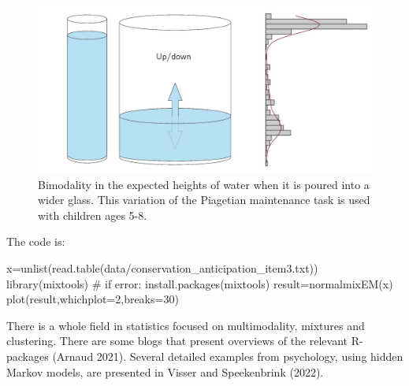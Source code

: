 \documentclass[
  a4paper,
  DIV=11,
  numbers=noendperiod]{scrreprt}
\newenvironment{Shaded}{\begin{snugshade}}{\end{snugshade}}
\newcommand{\AttributeTok}[1]{\textcolor[rgb]{0.40,0.45,0.13}{#1}}
\newcommand{\CommentTok}[1]{\textcolor[rgb]{0.37,0.37,0.37}{#1}}
\newcommand{\DecValTok}[1]{\textcolor[rgb]{0.68,0.00,0.00}{#1}}
\newcommand{\FunctionTok}[1]{\textcolor[rgb]{0.28,0.35,0.67}{#1}}
\newcommand{\NormalTok}[1]{\textcolor[rgb]{0.00,0.23,0.31}{#1}}
\newcommand{\OtherTok}[1]{\textcolor[rgb]{0.00,0.23,0.31}{#1}}
\newcommand{\StringTok}[1]{\textcolor[rgb]{0.13,0.47,0.30}{#1}}
\begin{document}
\begin{figure}

{\centering \includegraphics{media/ch3/fig-ch3-img20-old-32.jpg}

}

\caption{\label{fig-ch3-img20-old-32}Bimodality in the expected heights
of water when it is poured into a wider glass. This variation of the
Piagetian maintenance task is used with children ages 5-8.}

\end{figure}

The code is:

\begin{Shaded}
\begin{Highlighting}[]
\NormalTok{x}\OtherTok{=}\FunctionTok{unlist}\NormalTok{(}\FunctionTok{read.table}\NormalTok{(}\StringTok{\textquotesingle{}data/conservation\_anticipation\_item3.txt\textquotesingle{}}\NormalTok{))}
\FunctionTok{library}\NormalTok{(mixtools) }\CommentTok{\# if error: install.packages(\textquotesingle{}mixtools\textquotesingle{})}
\NormalTok{result}\OtherTok{=}\FunctionTok{normalmixEM}\NormalTok{(x)}
\FunctionTok{plot}\NormalTok{(result,}\AttributeTok{whichplot=}\DecValTok{2}\NormalTok{,}\AttributeTok{breaks=}\DecValTok{30}\NormalTok{)}
\end{Highlighting}
\end{Shaded}

There is a whole field in statistics focused on multimodality, mixtures
and clustering. There are some blogs that present overviews of the
relevant R-packages (Arnaud 2021). Several detailed examples from
psychology, using hidden Markov models, are presented in Visser and
Speekenbrink (2022).
\end{document}
